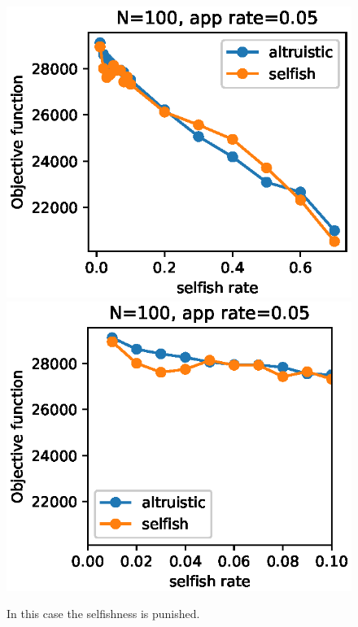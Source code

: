 \documentclass[conference,10.5pt]{IEEEtran}
\begin{document}
\begin{figure}
  \includegraphics{figures/obj_func_vs_selfish_rate_parabola_02.eps}
  \includegraphics{figures/obj_func_vs_selfish_rate_parabola02_zoom.eps}
  \caption{In this case the selfishness is punished.}
  \label{fig:par02}
\end{figure}
\end{document}
